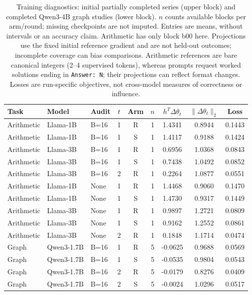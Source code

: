 \begin{table}[H]
\caption{Training diagnostics: initial partially completed series (upper block) and completed Qwen3-4B graph studies (lower block). $n$ counts available blocks per arm/round; missing checkpoints are not imputed. Entries are means, without intervals or an accuracy claim. Arithmetic has only block b00 here. Projections use the fixed initial reference gradient and are not held-out outcomes; incomplete coverage can bias comparisons. Arithmetic references are bare canonical integers (2--4 supervised tokens), whereas prompts request worked solutions ending in \texttt{Answer: N}; their projections can reflect format changes. Losses are run-specific objectives, not cross-model measures of correctness or influence.}
\label{tab:h100-partial}
\centering\small\setlength{\tabcolsep}{4pt}
\begin{tabular}{@{}lllcccccc@{}}
\toprule
Task & Model & Audit & $t$ & Arm & $n$ & $h^T\Delta\theta_t$ & $\|\Delta\theta_t\|_2$ & Loss\\
\midrule
Arithmetic & Llama-1B & B=16 & 1 & R & 1 & 1.4341 & 0.8944 & 0.1443\\
Arithmetic & Llama-1B & B=16 & 1 & S & 1 & 1.4117 & 0.9188 & 0.1424\\
Arithmetic & Llama-3B & B=16 & 1 & R & 1 & 0.6956 & 1.0368 & 0.0843\\
Arithmetic & Llama-3B & B=16 & 1 & S & 1 & 0.7438 & 1.0492 & 0.0852\\
Arithmetic & Llama-3B & B=16 & 2 & R & 1 & 0.2264 & 1.0877 & 0.0551\\
Arithmetic & Llama-1B & None & 1 & R & 1 & 1.4468 & 0.9060 & 0.1470\\
Arithmetic & Llama-1B & None & 1 & S & 1 & 1.4730 & 0.9317 & 0.1449\\
Arithmetic & Llama-3B & None & 1 & R & 1 & 0.9897 & 1.2721 & 0.0809\\
Arithmetic & Llama-3B & None & 1 & S & 1 & 0.9162 & 1.2552 & 0.0861\\
Arithmetic & Llama-3B & None & 2 & R & 1 & 0.1848 & 1.1714 & 0.0474\\
Graph & Qwen3-1.7B & B=16 & 1 & R & 5 & -0.0625 & 0.9688 & 0.0569\\
Graph & Qwen3-1.7B & B=16 & 1 & S & 5 & -0.0535 & 0.9804 & 0.0543\\
Graph & Qwen3-1.7B & B=16 & 2 & R & 5 & -0.0179 & 0.8276 & 0.0409\\
Graph & Qwen3-1.7B & B=16 & 2 & S & 5 & -0.0024 & 1.0296 & 0.0517\\

\end{tabular}
\end{table}
